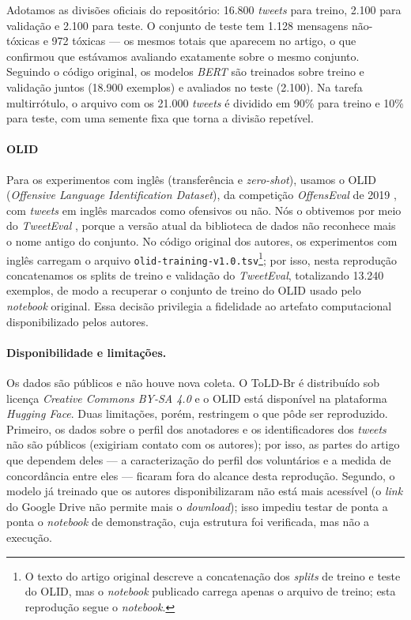 \documentclass[sigconf, nonacm]{acmart}
\begin{document}
Adotamos as divisões oficiais do repositório: 16.800 \emph{tweets} para
treino, 2.100 para validação e 2.100 para teste. O conjunto de teste tem
1.128 mensagens não-tóxicas e 972 tóxicas --- os mesmos totais que aparecem
no artigo, o que confirmou que estávamos avaliando exatamente sobre o mesmo
conjunto. Seguindo o código original, os modelos \emph{BERT} são treinados
sobre treino e validação juntos (18.900 exemplos) e avaliados no teste
(2.100). Na tarefa multirrótulo, o arquivo com os 21.000 \emph{tweets} é
dividido em 90\% para treino e 10\% para teste, com uma semente fixa que
torna a divisão repetível.
 
\paragraph{OLID} Para os experimentos com inglês (transferência e
\emph{zero-shot}), usamos o OLID (\emph{Offensive Language Identification
Dataset}), da competição \emph{OffensEval} de 2019
\cite{zampieri2019predicting}, com \emph{tweets} em inglês marcados como
ofensivos ou não. Nós o obtivemos por meio do \emph{TweetEval}
\cite{barbieri2020tweeteval}, porque a versão atual da biblioteca de dados
não reconhece mais o nome antigo do conjunto. No código original dos
autores, os experimentos com inglês carregam o arquivo
\texttt{olid-training-v1.0.tsv}\footnote{O texto do artigo original
descreve a concatenação dos \emph{splits} de treino e teste do OLID, mas o
\emph{notebook} publicado carrega apenas o arquivo de treino; esta
reprodução segue o \emph{notebook}.}; por isso, nesta reprodução concatenamos os
splits de treino e validação do \emph{TweetEval}, totalizando 13.240
exemplos, de modo a recuperar o conjunto de treino do OLID usado pelo
\emph{notebook} original. Essa decisão privilegia a fidelidade ao artefato
computacional disponibilizado pelos autores.
 
\paragraph{Disponibilidade e limitações.} Os dados são públicos e não houve
nova coleta. O ToLD-Br é distribuído sob licença \emph{Creative Commons
BY-SA 4.0} e o OLID está disponível na plataforma \emph{Hugging Face}. Duas
limitações, porém, restringem o que pôde ser reproduzido. Primeiro, os
dados sobre o perfil dos anotadores e os identificadores dos \emph{tweets}
não são públicos (exigiriam contato com os autores); por isso, as partes do
artigo que dependem deles --- a caracterização do perfil dos voluntários e
a medida de concordância entre eles --- ficaram fora do alcance desta
reprodução. Segundo, o modelo já treinado que os autores disponibilizaram
não está mais acessível (o \emph{link} do Google Drive não permite mais o
\emph{download}); isso impediu
testar de ponta a ponta o \emph{notebook} de demonstração, cuja estrutura
foi verificada, mas não a execução.
 
\end{document}
